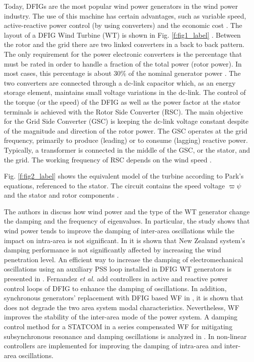\documentclass[conference,11pt]{IEEEtran}
\begin{document}
Today, DFIGs are the most popular wind power generators in the wind power industry. The use of this machine has certain advantages, such as variable speed, active-reactive power control (by using converters) and the economic cost \cite{ref1}. The layout of a DFIG Wind Turbine (WT) is shown in Fig. \ref{f:fig1_label} \cite{ref2}. Between the rotor and the grid there are two linked converters in a back to back pattern. The only requirement for the power electronic converters is the percentage that must be rated in order to handle a fraction of the total power (rotor power). In most cases, this percentage is about 30\% of the nominal generator power \cite{ref3}. The two converters are connected through a dc-link capacitor which, as an energy storage element, maintains small voltage variations in the dc-link. The control of the torque (or the speed) of the DFIG as well as the power factor at the stator terminals is achieved with the Rotor Side Converter (RSC). The main objective for the Grid Side Converter (GSC) is keeping the dc-link voltage constant despite of the magnitude and direction of the rotor power. The GSC operates at the grid frequency, primarily to produce (leading) or to consume (lagging) reactive power.  Typically, a transformer is connected in the middle of the GSC, or the stator, and the grid.  The working frequency of RSC depends on the wind speed \cite{ref2}. 

Fig. \ref{f:fig2_label} shows the equivalent model of the turbine according to Park’s equations, referenced to the stator. The circuit contains the speed voltage $\varpi\psi$ and the stator and rotor components \cite{ref1}. 

The authors in \cite{ref3} discuss how wind power and the type of the WT generator change the damping and the frequency of eigenvalues. In particular, the study shows that wind power tends to improve the damping of inter-area oscillations while the impact on intra-area is not significant. In \cite{ref4} it is shown that New Zealand system’s damping performance is not significantly affected by increasing the wind penetration level. An efficient way to increase the damping of electromechanical oscillations using an auxiliary PSS loop installed in DFIG WT generators is presented in \cite{ref5}. Fernandez \textit{et al.} \cite{ref6} add controllers in active and reactive power control loops of DFIG to enhance the damping of oscillations. In addition, synchronous generators' replacement with DFIG based WF in \cite{ref7}, it is shown that does not degrade the two area system modal characteristics. Nevertheless, WF improves the stability of the inter-area mode of the power system. A damping control method for a STATCOM in a series compensated WF for mitigating subsynchronous resonance and damping oscillations is analyzed in \cite{ref8}. In \cite{ref9} non-linear controllers are implemented for improving the damping of intra-area and inter-area oscillations. 
\end{document}
